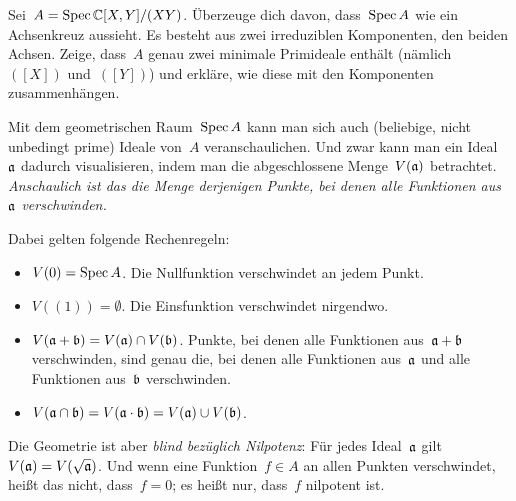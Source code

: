 \documentclass{uebblatt}
\begin{document}
\begin{fun}Sei~$A = \operatorname{Spec} \mathbb{C}[X,Y]/(XY)$. Überzeuge dich davon, dass~$\operatorname{Spec} A$
wie ein Achsenkreuz aussieht. Es besteht aus zwei irreduziblen Komponenten, den
beiden Achsen. Zeige, dass~$A$ genau zwei minimale Primideale enthält
(nämlich~$([X])$ und~$([Y])$) und erkläre, wie diese mit den Komponenten
zusammenhängen.
\end{fun}

Mit dem geometrischen Raum~$\operatorname{Spec} A$ kann man sich auch (beliebige, nicht
unbedingt prime) Ideale von~$A$ veranschaulichen. Und zwar kann man ein
Ideal~$\mathfrak{a}$ dadurch visualisieren, indem man die abgeschlossene
Menge~$V(\mathfrak{a})$ betrachtet. \emph{Anschaulich ist das die Menge derjenigen
Punkte, bei denen alle Funktionen aus~$\mathfrak{a}$ verschwinden.}

Dabei gelten folgende Rechenregeln:

\begin{itemize}
\item $V(0) = \operatorname{Spec} A$. Die Nullfunktion verschwindet an jedem Punkt.
\item $V((1)) = \emptyset$. Die Einsfunktion verschwindet nirgendwo.
\item $V(\mathfrak{a} + \mathfrak{b}) = V(\mathfrak{a}) \cap V(\mathfrak{b})$. Punkte, bei denen alle
Funktionen aus~$\mathfrak{a} + \mathfrak{b}$ verschwinden, sind genau die, bei denen alle
Funktionen aus~$\mathfrak{a}$ und alle Funktionen aus~$\mathfrak{b}$ verschwinden.
\item $V(\mathfrak{a} \cap \mathfrak{b}) = V(\mathfrak{a} \cdot \mathfrak{b}) = V(\mathfrak{a}) \cup V(\mathfrak{b})$.
\end{itemize}

Die Geometrie ist aber \emph{blind bezüglich Nilpotenz}: Für jedes Ideal~$\mathfrak{a}$
gilt~$V(\mathfrak{a}) = V(\sqrt{\mathfrak{a}})$. Und wenn eine Funktion~$f \in A$ an allen
Punkten verschwindet, heißt das nicht, dass~$f = 0$; es heißt nur, dass~$f$
nilpotent ist.
\end{document}
